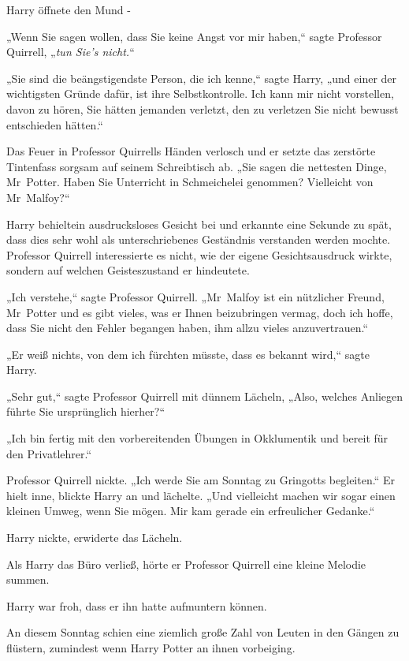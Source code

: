 {Harry öffnete den Mund -

„Wenn Sie sagen wollen, dass Sie keine Angst vor mir haben,“ sagte Professor Quirrell, „\emph{tun Sie's nicht.}“

„Sie sind die beängstigendste Person, die ich kenne,“ sagte Harry, „und einer der wichtigsten Gründe dafür, ist ihre Selbstkontrolle. Ich kann mir nicht vorstellen, davon zu hören, Sie hätten jemanden verletzt, den zu verletzen Sie nicht bewusst entschieden hätten.“

Das Feuer in Professor Quirrells Händen verlosch und er setzte das zerstörte Tintenfass sorgsam auf seinem Schreibtisch ab. „Sie sagen die nettesten Dinge, Mr~Potter. Haben Sie Unterricht in Schmeichelei genommen? Vielleicht von Mr~Malfoy?“

Harry behieltein ausdrucksloses Gesicht bei und erkannte eine Sekunde zu spät, dass dies sehr wohl als unterschriebenes Geständnis verstanden werden mochte. Professor Quirrell interessierte es nicht, wie der eigene Gesichtsausdruck wirkte, sondern auf welchen Geisteszustand er hindeutete.

„Ich verstehe,“ sagte Professor Quirrell. „Mr~Malfoy ist ein nützlicher Freund, Mr~Potter und es gibt vieles, was er Ihnen beizubringen vermag, doch ich hoffe, dass Sie nicht den Fehler begangen haben, ihm allzu vieles anzuvertrauen.“

„Er weiß nichts, von dem ich fürchten müsste, dass es bekannt wird,“ sagte Harry.

„Sehr gut,“ sagte Professor Quirrell mit dünnem Lächeln, „Also, welches Anliegen führte Sie ursprünglich hierher?“

„Ich bin fertig mit den vorbereitenden Übungen in Okklumentik und bereit für den Privatlehrer.“

Professor Quirrell nickte. „Ich werde Sie am Sonntag zu Gringotts begleiten.“ Er hielt inne, blickte Harry an und lächelte. „Und vielleicht machen wir sogar einen kleinen Umweg, wenn Sie mögen. Mir kam gerade ein erfreulicher Gedanke.“

Harry nickte, erwiderte das Lächeln.

Als Harry das Büro verließ, hörte er Professor Quirrell eine kleine Melodie summen.

Harry war froh, dass er ihn hatte aufmuntern können.

\later

An diesem Sonntag schien eine ziemlich große Zahl von Leuten in den Gängen zu flüstern, zumindest wenn Harry Potter an ihnen vorbeiging.

}
